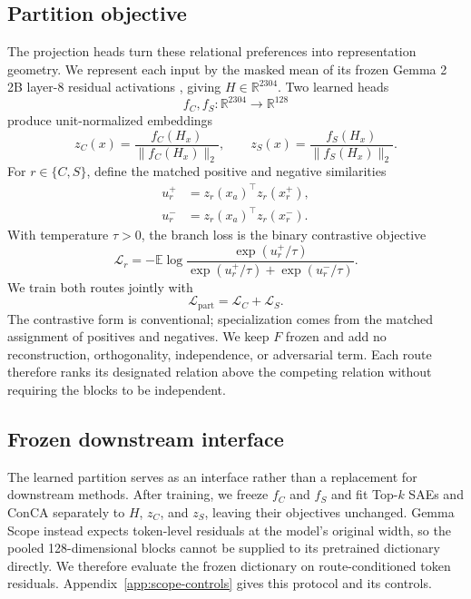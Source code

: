 \documentclass[11pt]{article}
\begin{document}
\subsection{Partition objective}
The projection heads turn these relational preferences into representation geometry. We represent each input by the masked mean of its frozen Gemma 2 2B layer-8 residual activations \citep{gemmateam2024gemma2}, giving $H\in\mathbb{R}^{2304}$. Two learned heads
\begin{equation}
f_C,f_S:\mathbb{R}^{2304}\rightarrow\mathbb{R}^{128}
\end{equation}
produce unit-normalized embeddings
\begin{equation}
z_C(x)=\frac{f_C(H_x)}{\lVert f_C(H_x)\rVert_2},
\qquad
z_S(x)=\frac{f_S(H_x)}{\lVert f_S(H_x)\rVert_2}.
\end{equation}
For $r\in\{C,S\}$, define the matched positive and negative similarities
\begin{equation}
\begin{aligned}
u_r^+&=z_r(x_a)^\top z_r(x_r^+),\\
u_r^-&=z_r(x_a)^\top z_r(x_r^-).
\end{aligned}
\end{equation}
With temperature $\tau>0$, the branch loss is the binary contrastive objective
\begin{equation}
\mathcal{L}_r
=-\mathbb{E}\log
\frac{\exp(u_r^+/\tau)}
{\exp(u_r^+/\tau)+\exp(u_r^-/\tau)}.
\label{eq:branch-loss}
\end{equation}
We train both routes jointly with
\begin{equation}
\mathcal{L}_{\mathrm{part}}=\mathcal{L}_C+\mathcal{L}_S.
\end{equation}
The contrastive form is conventional; specialization comes from the matched assignment of positives and negatives. We keep $F$ frozen and add no reconstruction, orthogonality, independence, or adversarial term. Each route therefore ranks its designated relation above the competing relation without requiring the blocks to be independent.

\subsection{Frozen downstream interface}
The learned partition serves as an interface rather than a replacement for downstream methods. After training, we freeze $f_C$ and $f_S$ and fit Top-$k$ SAEs and ConCA separately to $H$, $z_C$, and $z_S$, leaving their objectives unchanged. Gemma Scope instead expects token-level residuals at the model's original width, so the pooled 128-dimensional blocks cannot be supplied to its pretrained dictionary directly. We therefore evaluate the frozen dictionary on route-conditioned token residuals. Appendix~\ref{app:scope-controls} gives this protocol and its controls.
\end{document}
